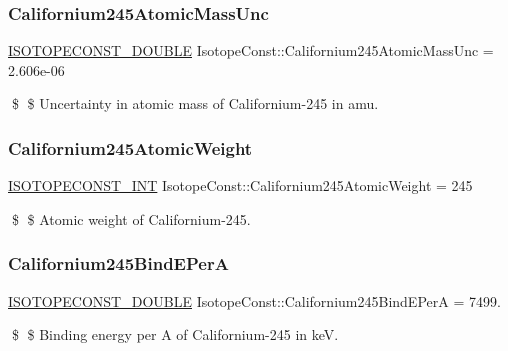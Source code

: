 \subsubsection{\texorpdfstring{Californium245\+Atomic\+Mass\+Unc}{Californium245AtomicMassUnc}}
{\footnotesize\ttfamily \mbox{\hyperlink{group___isotope_const-_macros_ga8f45a7272ce02c0b4c65c44636ed719a}{I\+S\+O\+T\+O\+P\+E\+C\+O\+N\+S\+T\+\_\+\+D\+O\+U\+B\+LE}} Isotope\+Const\+::\+Californium245\+Atomic\+Mass\+Unc = 2.\+606e-\/06}

\$ \$ Uncertainty in atomic mass of Californium-\/245 in amu. \mbox{\label{group___isotope_const-_californium-_cf245_gaf213c3abe3ef469f12d45e235dced984}} 
\subsubsection{\texorpdfstring{Californium245\+Atomic\+Weight}{Californium245AtomicWeight}}
{\footnotesize\ttfamily \mbox{\hyperlink{group___isotope_const-_macros_ga5f18360b3e99483a35c32d789e62621c}{I\+S\+O\+T\+O\+P\+E\+C\+O\+N\+S\+T\+\_\+\+I\+NT}} Isotope\+Const\+::\+Californium245\+Atomic\+Weight = 245}

\$ \$ Atomic weight of Californium-\/245. \mbox{\label{group___isotope_const-_californium-_cf245_gae477cba9482c6ac96c0f53c942bf7b31}} 
\subsubsection{\texorpdfstring{Californium245\+Bind\+E\+PerA}{Californium245BindEPerA}}
{\footnotesize\ttfamily \mbox{\hyperlink{group___isotope_const-_macros_ga8f45a7272ce02c0b4c65c44636ed719a}{I\+S\+O\+T\+O\+P\+E\+C\+O\+N\+S\+T\+\_\+\+D\+O\+U\+B\+LE}} Isotope\+Const\+::\+Californium245\+Bind\+E\+PerA = 7499.}

\$ \$ Binding energy per A of Californium-\/245 in keV. \mbox{\label{group___isotope_const-_californium-_cf245_ga281398adc5c01a2be0d0a1b870d81b86}} 
